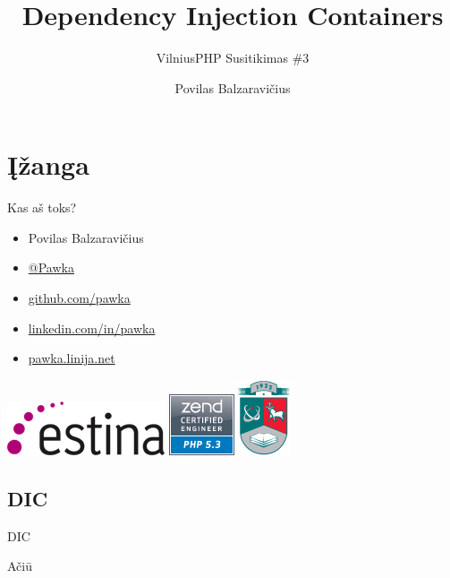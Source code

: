 \documentclass[12pt,a4paper]{beamer}
\author{Povilas Balzaravičius}
\title{Dependency Injection Containers}
\subtitle{VilniusPHP Susitikimas \#3}
\begin{document}
\section{Įžanga}
\begin{frame}
	\titlepage
\end{frame}

\begin{frame}{Kas aš toks?}
    \begin{itemize}
        \item Povilas Balzaravičius
        \item \href{https://twitter.com/pawka}{@Pawka}
        \item \href{https://github.com/pawka}{github.com/pawka}
        \item \href{https://linkedin.com/in/pawka}{linkedin.com/in/pawka}
        \item \href{http://pawka.linija.net}{pawka.linija.net}
    \end{itemize}
    \begin{center}
        \includegraphics[scale=0.4]{img/estina.png}
        \hskip1cm
        \includegraphics[scale=0.4]{img/zce.png}
        \hskip1cm
        \includegraphics[scale=0.4]{img/ktu.png}
    \end{center}
\end{frame}

\subsection{DIC}
\begin{frame}[fragile]

    {\Huge DIC}
\end{frame}


\begin{frame}
	\begin{center}
        {\Huge Ačiū}
	\end{center}
\end{frame}
\end{document}
